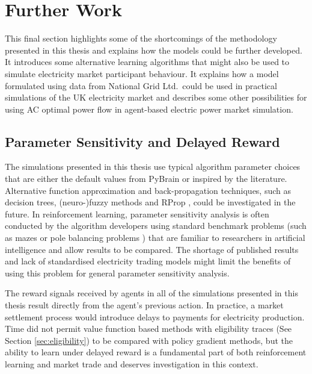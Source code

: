 \section{Further Work}
\label{sec:furtherwork}
This final section highlights some of the shortcomings of the methodology
presented in this thesis and explains how the models could be further developed.
It introduces some alternative learning algorithms that might also be used to
simulate electricity market participant behaviour.
It explains how a model formulated using data from National Grid Ltd.~could be
used in practical simulations of the UK electricity market and describes some
other possibilities for using AC optimal power flow in agent-based electric
power market simulation.

\subsection{Parameter Sensitivity and Delayed Reward}
The simulations presented in this thesis use typical algorithm parameter choices
that are either the default values from PyBrain or inspired by the literature.
Alternative function approximation and back-propagation techniques, such as
decision trees, (neuro-)fuzzy methods \cite{jang93anfis} and RProp
\cite{riedmiller93}, could be investigated in the future. In reinforcement
learning, parameter sensitivity analysis is often conducted by the algorithm
developers using standard benchmark problems (such as mazes or pole balancing
problems \cite{schaul:2010}) that are familiar to researchers in artificial
intelligence and allow results to be compared. The shortage of published results
and lack of standardised electricity trading models might limit the benefits of
using this problem for general parameter sensitivity analysis.

The reward signals received by agents in all of the simulations presented in
this thesis result directly from the agent's previous action.  In practice, a
market settlement process would introduce delays to payments for electricity
production. Time did not permit value function based methods with eligibility
traces (See Section \ref{sec:eligibility}) to be compared with policy gradient
methods, but the ability to learn under delayed reward is a fundamental part of
both reinforcement learning and market trade and deserves investigation in this
context.

